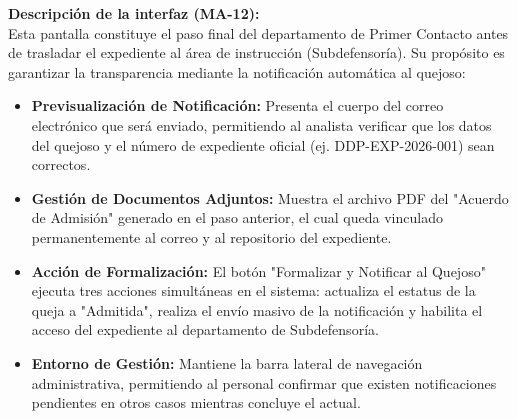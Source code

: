 \begin{appendices}
\noindent \textbf{Descripción de la interfaz (MA-12):} \\
Esta pantalla constituye el paso final del departamento de Primer Contacto antes de trasladar el expediente al área de instrucción (Subdefensoría). Su propósito es garantizar la transparencia mediante la notificación automática al quejoso:
\begin{itemize}
    \item \textbf{Previsualización de Notificación:} Presenta el cuerpo del correo electrónico que será enviado, permitiendo al analista verificar que los datos del quejoso y el número de expediente oficial (ej. DDP-EXP-2026-001) sean correctos.
    \item \textbf{Gestión de Documentos Adjuntos:} Muestra el archivo PDF del "Acuerdo de Admisión" generado en el paso anterior, el cual queda vinculado permanentemente al correo y al repositorio del expediente.
    \item \textbf{Acción de Formalización:} El botón "Formalizar y Notificar al Quejoso" ejecuta tres acciones simultáneas en el sistema: actualiza el estatus de la queja a "Admitida", realiza el envío masivo de la notificación y habilita el acceso del expediente al departamento de Subdefensoría.
    \item \textbf{Entorno de Gestión:} Mantiene la barra lateral de navegación administrativa, permitiendo al personal confirmar que existen notificaciones pendientes en otros casos mientras concluye el actual.
\end{itemize}

\end{appendices}